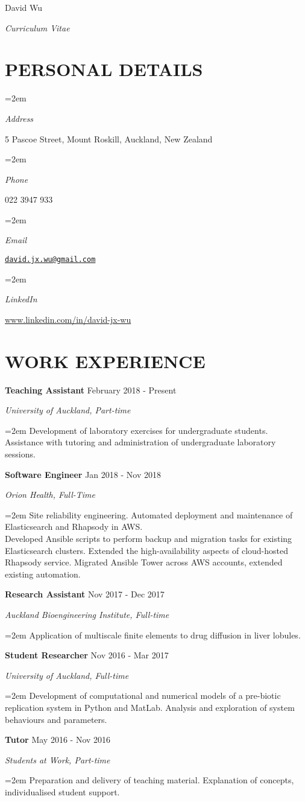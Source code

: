 \documentclass[paper=a4paper,fontsize=11pt]{scrartcl} %
\newlength{\spacebox}
\newcommand{\MyName}[1]{ %
		\Huge \usefont{T1}{phv}{b}{n} \hfill #1
		\par \normalsize \normalfont}
\newcommand{\MySlogan}[1]{ %
		\large \usefont{T1}{phv}{m}{n}\hfill \textit{#1}
		\par \normalsize \normalfont}
\newcommand{\NewPart}[1]{\section*{\uppercase{#1}}}
\newcommand{\PersonalEntry}[2]{
		\noindent\hangindent=2em\hangafter=0 %
		\parbox{\spacebox}{        %
		\textit{#1}}		       %
		\hspace{1.5em} #2 \par}    %
\newcommand{\EducationEntry}[4]{
		\noindent \textbf{#1} \hfill      %
		{#2} \par  %
		\noindent \textit{#3} \par        %
		\noindent\hangindent=2em\hangafter=0 \small #4 %
		\normalsize \par}
\newcommand{\WorkEntry}[4]{				  %
		\noindent \textbf{#1} \hfill      %
		{#2} \par  %
		\noindent \textit{#3} \par              %
		\noindent\hangindent=2em\hangafter=0 \small #4 %
		\normalsize \par}
\begin{document}
\vspace*{-1cm}
\MyName{David Wu}
\MySlogan{Curriculum Vitae}

\NewPart{Personal Details}

\PersonalEntry{Address}{5 Pascoe Street, Mount Roskill, Auckland, New Zealand}
\PersonalEntry{Phone}{022 3947 933}
\PersonalEntry{Email}{\href{mailto:david.jx.wu@gmail.com}{\texttt{david.jx.wu@gmail.com}}}
\PersonalEntry{LinkedIn}{\url{www.linkedin.com/in/david-jx-wu}}

\NewPart{Work experience}

\WorkEntry{Teaching Assistant}{February 2018 - Present}{University of Auckland, Part-time}{Development of laboratory exercises for undergraduate students. Assistance with tutoring and administration of undergraduate laboratory sessions.}

\WorkEntry{Software Engineer}{Jan 2018 - Nov 2018}{Orion Health, Full-Time}{Site reliability engineering. Automated deployment and maintenance of Elasticsearch and Rhapsody in AWS. \\Developed Ansible scripts to perform backup and migration tasks for existing Elasticsearch clusters. Extended the high-availability aspects of cloud-hosted Rhapsody service. Migrated Ansible Tower across AWS accounts, extended existing automation.}

\WorkEntry{Research Assistant}{Nov 2017 - Dec 2017}{Auckland Bioengineering Institute, Full-time}{Application of multiscale finite elements to drug diffusion in liver lobules.}

\WorkEntry{Student Researcher}{Nov 2016 - Mar 2017}{University of Auckland, Full-time}{Development of computational and numerical models of a pre-biotic replication system in Python and MatLab. Analysis and exploration of system behaviours and parameters.}
\par

\WorkEntry{Tutor}{May 2016 - Nov 2016}{Students at Work, Part-time}{Preparation and delivery of teaching material. Explanation of concepts, individualised student support.}
\end{document}
